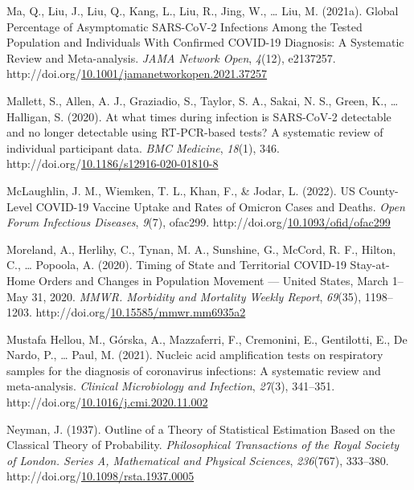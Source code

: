 \documentclass[12pt,twoside]{smiththesis}
\newlength{\cslhangindent}
\newenvironment{CSLReferences}[2] %
 {%
\setlength{\parindent}{0pt}
\ifodd #1 \everypar{\setlength{\hangindent}{\cslhangindent}}\ignorespaces\fi
\ifnum #2 > 0
\setlength{\parskip}{#2\baselineskip}
  \fi
}%
{}
\begin{document}
\begin{CSLReferences}{1}{0}
\leavevmode{}%
Ma, Q., Liu, J., Liu, Q., Kang, L., Liu, R., Jing, W., \ldots{} Liu, M. (2021a). Global {Percentage} of {Asymptomatic SARS-CoV-2 Infections Among} the {Tested Population} and {Individuals With Confirmed COVID-19 Diagnosis}: {A Systematic Review} and {Meta-analysis}. \emph{JAMA Network Open}, \emph{4}(12), e2137257. http://doi.org/\href{https://doi.org/10.1001/jamanetworkopen.2021.37257}{10.1001/jamanetworkopen.2021.37257}

\leavevmode{}%
Mallett, S., Allen, A. J., Graziadio, S., Taylor, S. A., Sakai, N. S., Green, K., \ldots{} Halligan, S. (2020). At what times during infection is {SARS-CoV-2} detectable and no longer detectable using {RT-PCR-based} tests? {A} systematic review of individual participant data. \emph{BMC Medicine}, \emph{18}(1), 346. http://doi.org/\href{https://doi.org/10.1186/s12916-020-01810-8}{10.1186/s12916-020-01810-8}

\leavevmode{}%
McLaughlin, J. M., Wiemken, T. L., Khan, F., \& Jodar, L. (2022). {US County-Level COVID-19 Vaccine Uptake} and {Rates} of {Omicron Cases} and {Deaths}. \emph{Open Forum Infectious Diseases}, \emph{9}(7), ofac299. http://doi.org/\href{https://doi.org/10.1093/ofid/ofac299}{10.1093/ofid/ofac299}

\leavevmode{}%
Moreland, A., Herlihy, C., Tynan, M. A., Sunshine, G., McCord, R. F., Hilton, C., \ldots{} Popoola, A. (2020). Timing of {State} and {Territorial COVID-19 Stay-at-Home Orders} and {Changes} in {Population Movement} --- {United States}, {March} 1--{May} 31, 2020. \emph{MMWR. Morbidity and Mortality Weekly Report}, \emph{69}(35), 1198--1203. http://doi.org/\href{https://doi.org/10.15585/mmwr.mm6935a2}{10.15585/mmwr.mm6935a2}

\leavevmode{}%
Mustafa Hellou, M., Górska, A., Mazzaferri, F., Cremonini, E., Gentilotti, E., De Nardo, P., \ldots{} Paul, M. (2021). Nucleic acid amplification tests on respiratory samples for the diagnosis of coronavirus infections: A systematic review and meta-analysis. \emph{Clinical Microbiology and Infection}, \emph{27}(3), 341--351. http://doi.org/\href{https://doi.org/10.1016/j.cmi.2020.11.002}{10.1016/j.cmi.2020.11.002}

\leavevmode{}%
Neyman, J. (1937). Outline of a {Theory} of {Statistical Estimation Based} on the {Classical Theory} of {Probability}. \emph{Philosophical Transactions of the Royal Society of London. Series A, Mathematical and Physical Sciences}, \emph{236}(767), 333--380. http://doi.org/\href{https://doi.org/10.1098/rsta.1937.0005}{10.1098/rsta.1937.0005}


\end{CSLReferences}
\end{document}
